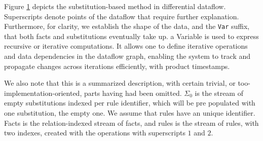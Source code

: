 \documentclass[sigconf,screen,review,natbib]{acmart}
\theoremstyle{definition}
\begin{document}
\begin{figure} [htb!]
	\caption{}
	\label{fig:substitution_simple_ddflow}
\end{figure}

Figure \ref{fig:substitution_simple_ddflow} depicts the substitution-based method in differential dataflow. Superscripts denote
points of the dataflow that require further explanation. Furthermore, for clarity, we establish the shape of the
data, and the \verb|Var| suffix, that both facts and substitutions eventually take up. a Variable is used to express
recursive or iterative computations. It allows one to define iterative operations and data dependencies in the dataflow
graph, enabling the system to track and propagate changes across iterations efficiently, with product timestamps.

We also note that this is a summarized description, with certain trivial, or too-implementation-oriented, parts
having had been omitted. $\Sigma_0$ is the stream of empty substitutions indexed per rule identifier, which will
be pre populated with one substitution, the empty one. We assume that rules have an unique identifier. Facts is
the relation-indexed stream of facts, and rules is the stream of rules, with two indexes, created with the operations
with superscripts $1$ and $2$.
\end{document}
